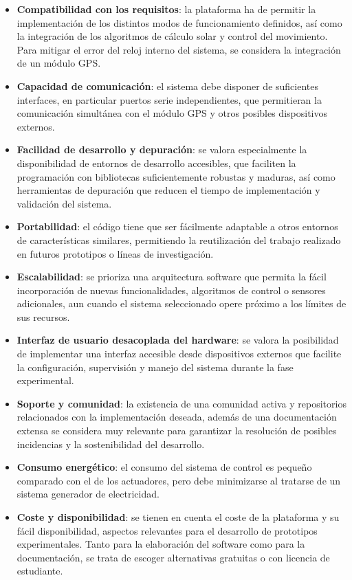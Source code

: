 \begin{itemize}
	\item \textbf{Compatibilidad con los requisitos}: la plataforma ha de permitir la implementación de los distintos modos de funcionamiento definidos, así como la integración de los algoritmos de cálculo solar y control del movimiento. Para mitigar el error del reloj interno del sistema, se considera la integración de un módulo GPS.
	\item \textbf{Capacidad de comunicación}: el sistema debe disponer de suficientes interfaces, en particular puertos serie independientes, que permitieran la comunicación simultánea con el módulo GPS y otros posibles dispositivos externos.	
	\item \textbf{Facilidad de desarrollo y depuración}: se valora especialmente la disponibilidad de entornos de desarrollo accesibles, que faciliten la programación con bibliotecas suficientemente robustas y maduras, así como herramientas de depuración que reducen el tiempo de implementación y validación del sistema.	
	\item \textbf{Portabilidad}: el código tiene que ser fácilmente adaptable a otros entornos de características similares, permitiendo la reutilización del trabajo realizado en futuros prototipos o líneas de investigación.	
	\item \textbf{Escalabilidad}: se prioriza una arquitectura software que permita la fácil incorporación de nuevas funcionalidades, algoritmos de control o sensores adicionales, aun cuando el sistema seleccionado opere próximo a los límites de sus recursos.	
	\item \textbf{Interfaz de usuario desacoplada del hardware}: se valora la posibilidad de implementar una interfaz accesible desde dispositivos externos que facilite la configuración, supervisión y manejo del sistema durante la fase experimental.
	\item \textbf{Soporte y comunidad}: la existencia de una comunidad activa y repositorios relacionados con la implementación deseada, además de una documentación extensa se considera muy relevante para garantizar la resolución de posibles incidencias y la sostenibilidad del desarrollo.	
	\item \textbf{Consumo energético}: el consumo del sistema de control es pequeño comparado con el de los actuadores, pero debe minimizarse al tratarse de un sistema generador de electricidad.
	\item \textbf{Coste y disponibilidad}: se tienen en cuenta el coste de la plataforma y su fácil disponibilidad, aspectos relevantes para el desarrollo de prototipos experimentales. Tanto para la elaboración del software como para la documentación, se trata de escoger alternativas gratuitas o con licencia de estudiante.
\end{itemize}

